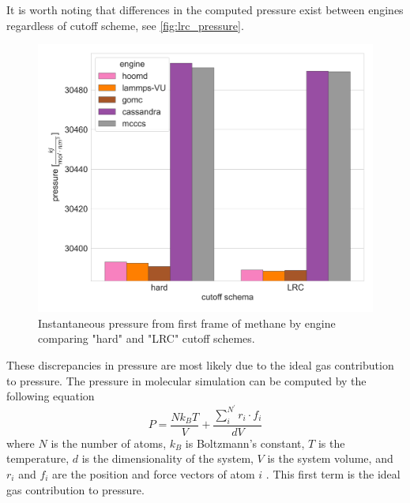 It is worth noting that differences in the computed pressure exist between engines regardless of cutoff scheme, see \autoref{fig:lrc_pressure}.
\begin{figure}[h!]
    \centering
    \includegraphics[width=0.8\linewidth,keepaspectratio]{figures/rep_study/lrc_pressure.png}
    \caption{Instantaneous pressure from first frame of methane by engine comparing "hard" and "LRC" cutoff schemes.}\label{fig:lrc_pressure}
\end{figure}
These discrepancies in pressure are most likely due to the ideal gas contribution to pressure. 
The pressure in molecular simulation can be computed by the following equation
\begin{equation}\label{eq:pressure}
    P = \frac{N k_{B} T}{V} + \frac{\sum_{i}^{N^{'}} r_{i} \cdot f_{i}}{dV}
\end{equation}
where $N$ is the number of atoms, $k_{B}$ is Boltzmann's constant, $T$ is the temperature, $d$ is the dimensionality of the system, $V$ is the system volume, and $r_i$ and $f_i$ are the position and force vectors of atom $i$ \citep{Thompson2009}.
This first term is the ideal gas contribution to pressure.


